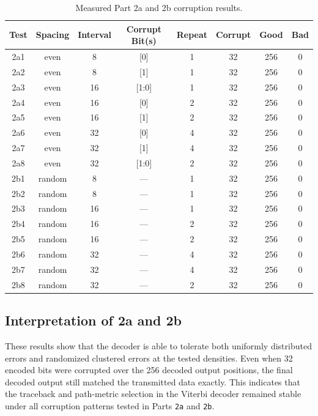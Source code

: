\documentclass{article}
\begin{document}
\begin{table}[h]
\centering
\begin{tabular}{|c|c|c|c|c|c|c|c|}
\hline
Test & Spacing & Interval & Corrupt Bit(s) & Repeat & Corrupt & Good & Bad \\
\hline
2a1 & even   & 8  & [0]   & 1 & 32 & 256 & 0 \\
2a2 & even   & 8  & [1]   & 1 & 32 & 256 & 0 \\
2a3 & even   & 16 & [1:0] & 1 & 32 & 256 & 0 \\
2a4 & even   & 16 & [0]   & 2 & 32 & 256 & 0 \\
2a5 & even   & 16 & [1]   & 2 & 32 & 256 & 0 \\
2a6 & even   & 32 & [0]   & 4 & 32 & 256 & 0 \\
2a7 & even   & 32 & [1]   & 4 & 32 & 256 & 0 \\
2a8 & even   & 32 & [1:0] & 2 & 32 & 256 & 0 \\
\hline
2b1 & random & 8  & ---   & 1 & 32 & 256 & 0 \\
2b2 & random & 8  & ---   & 1 & 32 & 256 & 0 \\
2b3 & random & 16 & ---   & 1 & 32 & 256 & 0 \\
2b4 & random & 16 & ---   & 2 & 32 & 256 & 0 \\
2b5 & random & 16 & ---   & 2 & 32 & 256 & 0 \\
2b6 & random & 32 & ---   & 4 & 32 & 256 & 0 \\
2b7 & random & 32 & ---   & 4 & 32 & 256 & 0 \\
2b8 & random & 32 & ---   & 2 & 32 & 256 & 0 \\
\hline
\end{tabular}
\caption{Measured Part 2a and 2b corruption results.}
\end{table}

\subsection{Interpretation of 2a and 2b}

These results show that the decoder is able to tolerate both uniformly distributed errors and randomized clustered errors at the tested densities. Even when 32 encoded bits were corrupted over the 256 decoded output positions, the final decoded output still matched the transmitted data exactly. This indicates that the traceback and path-metric selection in the Viterbi decoder remained stable under all corruption patterns tested in Parts \texttt{2a} and \texttt{2b}.
\end{document}
